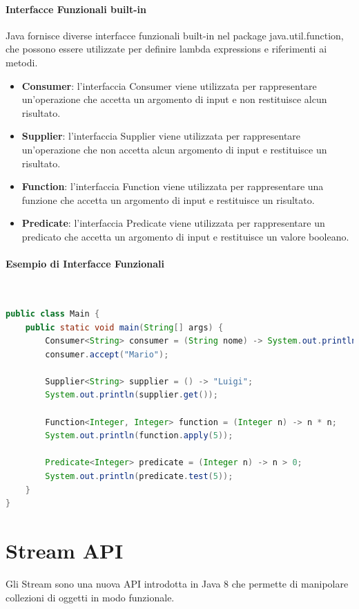 \documentclass[11pt]{article}
\begin{document}
\paragraph{Interfacce Funzionali built-in}
Java fornisce diverse interfacce funzionali built-in nel package java.util.function, che possono essere utilizzate per definire lambda expressions e riferimenti ai metodi.
\begin{itemize}
    \item \textbf{Consumer}: l'interfaccia Consumer viene utilizzata per rappresentare un'operazione che accetta un argomento di input e non restituisce alcun risultato.
    \item \textbf{Supplier}: l'interfaccia Supplier viene utilizzata per rappresentare un'operazione che non accetta alcun argomento di input e restituisce un risultato.
    \item \textbf{Function}: l'interfaccia Function viene utilizzata per rappresentare una funzione che accetta un argomento di input e restituisce un risultato.
    \item \textbf{Predicate}: l'interfaccia Predicate viene utilizzata per rappresentare un predicato che accetta un argomento di input e restituisce un valore booleano.
    \end{itemize}
\paragraph{Esempio di Interfacce Funzionali}
\\
\begin{lstlisting}[language=Java]
public class Main {
    public static void main(String[] args) {
        Consumer<String> consumer = (String nome) -> System.out.println(nome);
        consumer.accept("Mario");

        Supplier<String> supplier = () -> "Luigi";
        System.out.println(supplier.get());

        Function<Integer, Integer> function = (Integer n) -> n * n;
        System.out.println(function.apply(5));

        Predicate<Integer> predicate = (Integer n) -> n > 0;
        System.out.println(predicate.test(5));
    }
}
\end{lstlisting}
\section{Stream API}
Gli Stream sono una nuova API introdotta in Java 8 che permette di manipolare collezioni di oggetti in modo funzionale.
\end{document}
